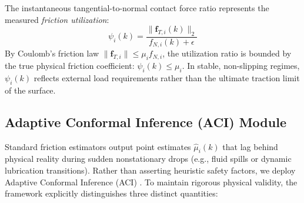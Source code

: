 The instantaneous tangential-to-normal contact force ratio represents the measured \emph{friction utilization}:
\begin{equation}
    \psi_i(k) = \frac{\|\mathbf{f}_{T, i}(k)\|_2}{f_{N, i}(k) + \epsilon}
    \label{eq:friction_utilization}
\end{equation}
By Coulomb's friction law $\|\mathbf{f}_{T, i}\| \le \mu_i f_{N, i}$, the utilization ratio is bounded by the true physical friction coefficient: $\psi_i(k) \le \mu_i$. In stable, non-slipping regimes, $\psi_i(k)$ reflects external load requirements rather than the ultimate traction limit of the surface.

\subsection{Adaptive Conformal Inference (ACI) Module}
Standard friction estimators output point estimates $\hat{\mu}_i(k)$ that lag behind physical reality during sudden nonstationary drops (e.g., fluid spills or dynamic lubrication transitions). Rather than asserting heuristic safety factors, we deploy Adaptive Conformal Inference (ACI) \cite{gibbs2021adaptive}. To maintain rigorous physical validity, the framework explicitly distinguishes three distinct quantities:
